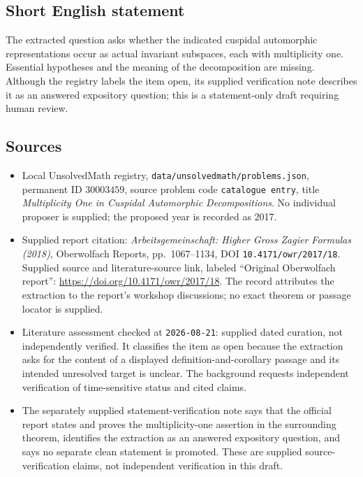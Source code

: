 \documentclass[11pt]{article}
\begin{document}
\subsection{Short English statement}
The extracted question asks whether the indicated cuspidal automorphic representations occur as actual invariant subspaces, each with multiplicity one. Essential hypotheses and the meaning of the decomposition are missing. Although the registry labels the item open, its supplied verification note describes it as an answered expository question; this is a statement-only draft requiring human review.
\subsection{Sources}
\begin{itemize}
\item Local UnsolvedMath registry, \texttt{data/unsolvedmath/problems.json}, permanent ID \(30003459\), source problem code \texttt{catalogue entry}, title \emph{Multiplicity One in Cuspidal Automorphic Decompositions}. No individual proposer is supplied; the proposed year is recorded as 2017.
\item Supplied report citation: \emph{Arbeitsgemeinschaft: Higher Gross Zagier Formulas (2018)}, Oberwolfach Reports, pp.~1067--1134, DOI \texttt{10.4171/owr/2017/18}. Supplied source and literature-source link, labeled ``Original Oberwolfach report'': \url{https://doi.org/10.4171/owr/2017/18}. The record attributes the extraction to the report's workshop discussions; no exact theorem or passage locator is supplied.
\item Literature assessment checked at \texttt{2026-08-21}: supplied dated curation, not independently verified. It classifies the item as open because the extraction asks for the content of a displayed definition-and-corollary passage and its intended unresolved target is unclear. The background requests independent verification of time-sensitive status and cited claims.
\item The separately supplied statement-verification note says that the official report states and proves the multiplicity-one assertion in the surrounding theorem, identifies the extraction as an answered expository question, and says no separate clean statement is promoted. These are supplied source-verification claims, not independent verification in this draft.
\end{itemize}
\end{document}
